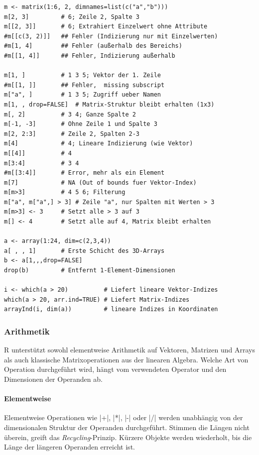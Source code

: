 \documentclass[10pt,twocolumn]{scrartcl}
\renewcommand{\lstinline}{\mycoloredinline}
\begin{document}
\begin{lstlisting}
m <- matrix(1:6, 2, dimnames=list(c("a","b")))
m[2, 3]         # 6; Zeile 2, Spalte 3
m[[2, 3]]       # 6; Extrahiert Einzelwert ohne Attribute
#m[[c(3, 2)]]   ## Fehler (Indizierung nur mit Einzelwerten)
#m[1, 4]        ## Fehler (außerhalb des Bereichs)
#m[[1, 4]]      ## Fehler, Indizierung außerhalb

m[1, ]          # 1 3 5; Vektor der 1. Zeile
#m[[1, ]]       ## Fehler,  missing subscript
m["a", ]        # 1 3 5; Zugriff ueber Namen
m[1, , drop=FALSE]  # Matrix-Struktur bleibt erhalten (1x3)
m[, 2]          # 3 4; Ganze Spalte 2
m[-1, -3]       # Ohne Zeile 1 und Spalte 3
m[2, 2:3]       # Zeile 2, Spalten 2-3
m[4]            # 4; Lineare Indizierung (wie Vektor)
m[[4]]          # 4
m[3:4]          # 3 4
#m[[3:4]]       # Error, mehr als ein Element
m[7]            # NA (Out of bounds fuer Vektor-Index)
m[m>3]          # 4 5 6; Filterung
m["a", m["a",] > 3] # Zeile "a", nur Spalten mit Werten > 3
m[m>3] <- 3     # Setzt alle > 3 auf 3
m[] <- 4        # Setzt alle auf 4, Matrix bleibt erhalten

a <- array(1:24, dim=c(2,3,4))
a[ , , 1]       # Erste Schicht des 3D-Arrays
b <- a[1,,,drop=FALSE]
drop(b)         # Entfernt 1-Element-Dimensionen

i <- which(a > 20)          # Liefert lineare Vektor-Indizes
which(a > 20, arr.ind=TRUE) # Liefert Matrix-Indizes
arrayInd(i, dim(a))         # lineare Indizes in Koordinaten
\end{lstlisting}


\subsubsection{Arithmetik}

R unterstützt sowohl elementweise Arithmetik auf Vektoren, Matrizen und Arrays als auch klassische Matrixoperationen aus der linearen Algebra. Welche Art von Operation durchgeführt wird, hängt vom verwendeten Operator und den Dimensionen der Operanden ab.

\paragraph{Elementweise}

Elementweise Operationen wie \lstinline|+|, \lstinline|*|, \lstinline|-| oder \lstinline|/| werden unabhängig von der dimensionalen Struktur der Operanden durchgeführt. Stimmen die Längen nicht überein, greift das \emph{Recycling}-Prinzip. Kürzere Objekte werden wiederholt, bis die Länge der längeren Operanden erreicht ist.
\end{document}
